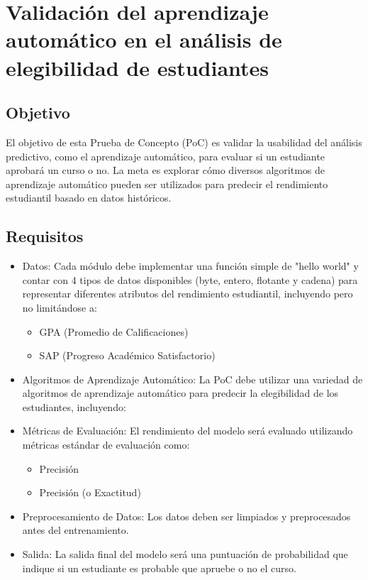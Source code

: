 \section{Validación del aprendizaje automático en el análisis de elegibilidad de estudiantes}

\subsection*{Objetivo}
El objetivo de esta Prueba de Concepto (PoC) es validar la usabilidad del análisis predictivo, como el aprendizaje automático, para evaluar si un estudiante aprobará un curso o no. La meta es explorar cómo diversos algoritmos de aprendizaje automático pueden ser utilizados para predecir el rendimiento estudiantil basado en datos históricos.

\subsection*{Requisitos}
\begin{itemize}
    \item Datos: Cada módulo debe implementar una función simple de "hello world" y contar con 4 tipos de datos disponibles (byte, entero, flotante y cadena) para representar diferentes atributos del rendimiento estudiantil, incluyendo pero no limitándose a:
    \begin{itemize}
        \item GPA (Promedio de Calificaciones)
        \item SAP (Progreso Académico Satisfactorio)
    \end{itemize}
    \item Algoritmos de Aprendizaje Automático: La PoC debe utilizar una variedad de algoritmos de aprendizaje automático para predecir la elegibilidad de los estudiantes, incluyendo:
    \item Métricas de Evaluación: El rendimiento del modelo será evaluado utilizando métricas estándar de evaluación como:
    \begin{itemize}
        \item Precisión
        \item Precisión (o Exactitud)
    \end{itemize}
    \item Preprocesamiento de Datos: Los datos deben ser limpiados y preprocesados antes del entrenamiento.
    \item Salida: La salida final del modelo será una puntuación de probabilidad que indique si un estudiante es probable que apruebe o no el curso.
\end{itemize}
